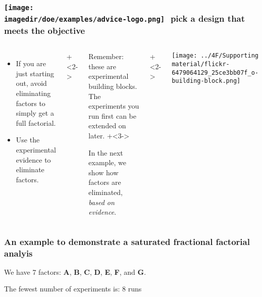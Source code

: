 \begin{frame}\frametitle{\texttt{[image: \\imagedir/doe/examples/advice-logo.png]}\,\, pick a design that meets the objective}
	
	\begin{columns}[T]
		
			\begin{itemize}
				\item	If you are just starting out, avoid eliminating factors to simply get a full factorial.
				\item	Use the experimental evidence to eliminate factors.
			\end{itemize}
			
			
			\vspace{1cm}
			\onslide+<2->{
				\begin{itemize}
					\item	Remember: these are experimental building blocks. The experiments you run first can be extended on later.
					\vspace{0.5cm}
					\onslide+<3->{
						\item	In the next example, we show how factors are eliminated, {\color{myOrange}\emph{based on evidence}}.
					}
				\end{itemize}
			}
	
			\vspace{1cm}
			
			\onslide+<2->{
				\centerline{\texttt{[image: ../4F/Supporting material/flickr-6479064129\_25ce3bb07f\_o-building-block.png]}}
		
			}
	\end{columns}
\end{frame}

\begin{frame}\frametitle{An example to demonstrate a saturated fractional factorial analyis}
	We have 7 factors: \textbf{A}, \textbf{B}, \textbf{C}, \textbf{D}, \textbf{E}, \textbf{F}, and \textbf{G}.
	
	\vspace{1cm}
	The fewest number of experiments is: 8 runs
	\vfill
\end{frame}

